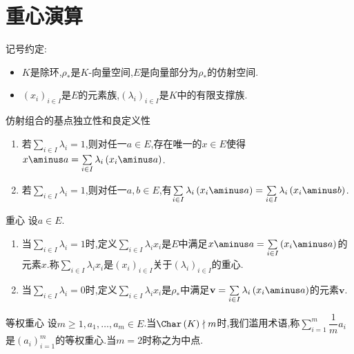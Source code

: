 \section{重心演算}

记号约定:

\begin{itemize}
	\item $K$是除环,$\rho_{\ast}$是$K$-向量空间,$E$是向量部分为$\rho_{\ast}$的仿射空间.
	\item $\left(x_{i}\right)_{i\in I}$是$E$的元素族,$\left(\lambda_{i}\right)_{i\in I}$是$K$中的有限支撑族.
\end{itemize}

\begin{proposition}{仿射组合的基点独立性和良定义性}{}
	\begin{enumerate}
		\item 若$\sum\limits_{i\in I}\lambda_{i}=1$,则对任一$a\in E$,存在唯一的$x\in E$使得$x\aminus a=\sum\limits_{i\in I}\lambda_{i}\left(x_{i}\aminus a\right)$.
		\item 若$\sum\limits_{i\in I}\lambda_{i}=1$,则对任一$a,b\in E$,有$\sum\limits_{i\in I}\lambda_{i}\left(x_{i}\aminus a\right)=\sum\limits_{i\in I}\lambda_{i}\left(x_{i}\aminus b\right)$.
	\end{enumerate}
\end{proposition}

\begin{definition}{重心}{}
	设$a\in E$.
	\begin{enumerate}
		\item 当$\sum\limits_{i\in I}\lambda_{i}=1$时,定义$\sum\limits_{i\in I}\lambda_{i}x_{i}$是$E$中满足$x\aminus a=\sum\limits_{i\in I}\left(x_{i}\aminus a\right)$的元素$x$.称$\sum\limits_{i\in I}\lambda_{i}x_{i}$是$\left(x_{i}\right)_{i\in I}$关于$\left(\lambda_{i}\right)_{i\in I}$的重心.
		\item 当$\sum\limits_{i\in I}\lambda_{i}=0$时,定义$\sum\limits_{i\in I}\lambda_{i}x_{i}$是$\rho_{\ast}$中满足$\mathbf{v}=\sum\limits_{i\in I}\lambda_{i}\left(x_{i}\aminus a\right)$的元素$\mathbf{v}$.
	\end{enumerate}
\end{definition}

\begin{remark}{等权重心}{}
	设$m\geq 1,a_{1},\ldots,a_{m}\in E$.当$\Char\left(K\right)\nmid m$时,我们滥用术语,称$\sum\limits_{i=1}^{m}\dfrac{1}{m}a_{i}$是$\left(a_{i}\right)_{i=1}^{m}$的等权重心.当$m=2$时称之为中点.
\end{remark}



